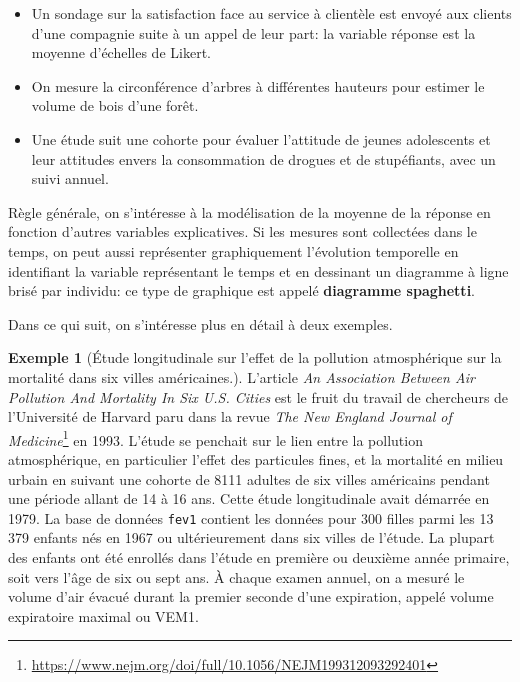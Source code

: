 \documentclass[
  11pt,
  letterpaper,
]{article}
\providecommand{\tightlist}{%
  \setlength{\itemsep}{0pt}\setlength{\parskip}{0pt}}
\renewcommand{\href}[2]{#2\footnote{\url{#1}}}
\theoremstyle{definition}
\theoremstyle{definition}
\newtheorem{example}{Exemple}[section]
\theoremstyle{definition}
\theoremstyle{definition}
\theoremstyle{remark}
\begin{document}
\begin{itemize}
\tightlist
\item
  Un sondage sur la satisfaction face au service à clientèle est envoyé aux clients d'une compagnie suite à un appel de leur part: la variable réponse est la moyenne d'échelles de Likert.
\item
  On mesure la circonférence d'arbres à différentes hauteurs pour estimer le volume de bois d'une forêt.
\item
  Une étude suit une cohorte pour évaluer l'attitude de jeunes adolescents et leur attitudes envers la consommation de drogues et de stupéfiants, avec un suivi annuel.
\end{itemize}

Règle générale, on s'intéresse à la modélisation de la moyenne de la réponse en fonction d'autres variables explicatives. Si les mesures sont collectées dans le temps, on peut aussi représenter graphiquement l'évolution temporelle en identifiant la variable représentant le temps et en dessinant un diagramme à ligne brisé par individu: ce type de graphique est appelé \textbf{diagramme spaghetti}.

Dans ce qui suit, on s'intéresse plus en détail à deux exemples.

\begin{example}[Étude longitudinale sur l'effet de la pollution atmosphérique sur la mortalité dans six villes américaines.]
\protect\hypertarget{exm:sixvilles}{}\label{exm:sixvilles}L'article \emph{An Association Between Air Pollution And Mortality In Six U.S. Cities} est le fruit du travail de chercheurs de l'Université de Harvard \href{https://www.nejm.org/doi/full/10.1056/NEJM199312093292401}{paru dans la revue \emph{The New England Journal of Medicine}} en 1993. L'étude se penchait sur le lien entre la pollution atmosphérique, en particulier l'effet des particules fines, et la mortalité en milieu urbain en suivant une cohorte de 8111 adultes de six villes américains pendant une période allant de 14 à 16 ans. Cette étude longitudinale avait démarrée en 1979. La base de données \texttt{fev1} contient les données pour 300 filles parmi les 13 379 enfants nés en 1967 ou ultérieurement dans six villes de l'étude. La plupart des enfants ont été enrollés dans l'étude en première ou deuxième année primaire, soit vers l'âge de six ou sept ans. À chaque examen annuel, on a mesuré le volume d'air évacué durant la premier seconde d'une expiration, appelé volume expiratoire maximal ou VEM1.
\end{example}
\end{document}
